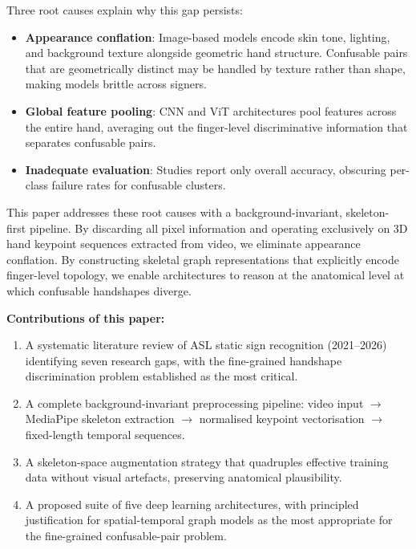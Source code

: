 \documentclass[conference]{IEEEtran}
\begin{document}
Three root causes explain why this gap persists:
\begin{itemize}
  \item \textbf{Appearance conflation}: Image-based models encode skin tone,
        lighting, and background texture alongside geometric hand structure.
        Confusable pairs that are geometrically distinct may be handled by
        texture rather than shape, making models brittle across signers.
  \item \textbf{Global feature pooling}: CNN and ViT architectures pool features
        across the entire hand, averaging out the finger-level discriminative
        information that separates confusable pairs.
  \item \textbf{Inadequate evaluation}: Studies report only overall accuracy,
        obscuring per-class failure rates for confusable clusters.
\end{itemize}

This paper addresses these root causes with a background-invariant, skeleton-
first pipeline. By discarding all pixel information and operating exclusively on
3D hand keypoint sequences extracted from video, we eliminate appearance
conflation. By constructing skeletal graph representations that explicitly encode
finger-level topology, we enable architectures to reason at the anatomical level
at which confusable handshapes diverge.

\textbf{Contributions of this paper:}
\begin{enumerate}
  \item A systematic literature review of ASL static sign recognition (2021--2026)
        identifying seven research gaps, with the fine-grained handshape
        discrimination problem established as the most critical.
  \item A complete background-invariant preprocessing pipeline: video input
        $\rightarrow$ MediaPipe skeleton extraction $\rightarrow$ normalised
        keypoint vectorisation $\rightarrow$ fixed-length temporal sequences.
  \item A skeleton-space augmentation strategy that quadruples effective training
        data without visual artefacts, preserving anatomical plausibility.
  \item A proposed suite of five deep learning architectures, with principled
        justification for spatial-temporal graph models as the most appropriate
        for the fine-grained confusable-pair problem.
\end{enumerate}
\end{document}
